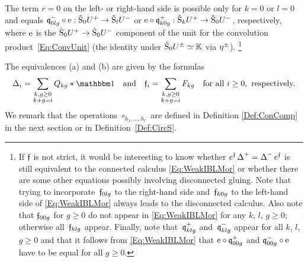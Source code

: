 \documentclass[\MainFolder/Text.tex]{subfiles}
\begin{document}
\begin{Proposition}
\begin{ClaimList}
\begin{enumerate}[label=(\arabic*)]
The term $r=0$ on the left- or right-hand side is possible only for $k=0$ or $l=0$ and equals $\mathfrak{q}_{0lg}^-\circ\mathrm{e}: \hat{\mathrm{S}}_0 U^+ \rightarrow \hat{\mathrm{S}}_l U^-$ or $\mathrm{e}\circ\mathfrak{q}_{k0g}^+: \hat{\mathrm{S}}_k U^+ \rightarrow \hat{\mathrm{S}}_0 U^-$, respectively, where $\mathrm{e}$ is the $\hat{\mathrm{S}}_0 U^+ \rightarrow \hat{\mathrm{S}}_0 U^-$ component of the unit for the convolution product~\eqref{Eq:ConvUnit} (the identity under $\hat{\mathrm{S}}_0 U^{\pm} \simeq \mathbb{K}$ via $\eta^{\pm}$). \footnote{If $\mathfrak{f}$ is not strict, it would be interesting to know whether $e^{\mathfrak{f}} \operatorname{\Delta}^+ = \operatorname{\Delta}^- e^{\mathfrak{f}}$ is still equivalent to the connected calculus \eqref{Eq:WeakIBLMor} or whether there are some other equations possibly involving disconnected gluing. Note that trying to incorporate~$\mathfrak{f}_{0lg}$ to the right-hand side and~$\mathfrak{f}_{k0g}$ to the left-hand side of \eqref{Eq:WeakIBLMor} always leads to the disconnected calculus. Also note that $\mathfrak{f}_{00g}$ for $g\ge 0$ do not appear in \eqref{Eq:WeakIBLMor} for any $k$, $l$, $g\ge 0$; otherwise all~$\mathfrak{f}_{klg}$ appear. Finally, note that~$\mathfrak{q}_{klg}^+$ and~$\mathfrak{q}_{klg}^-$ appear for all $k$, $l$, $g\ge 0$ and that it follows from \eqref{Eq:WeakIBLMor} that $\mathrm{e}\circ\mathfrak{q}_{00g}^+$ and $\mathfrak{q}_{00g}^-\circ\mathrm{e}$ have to be equal for all $g\ge 0$.}
\end{enumerate}
\end{ClaimList}
The equivalences (a) and (b) are given by the formulas
\begin{equation}\label{Eq:FormulasSums}
\BVOp_i = \sum_{\substack{k, g\ge 0 \\k+g=i}} Q_{kg}\Star\Id \quad\text{and}\quad\MVMorF_i = \sum_{\substack{k,g\ge 0\\k+g=i}} F_{kg}\quad\text{for all }i\ge 0,\text{ respectively.}
\end{equation}
We remark that the operations $\circ_{h_1,\dotsc,h_r}$ are  defined in Definition \ref{Def:ConComp} in the next section or in Definition~\ref{Def:CircS}.


\end{Proposition}
\end{document}
